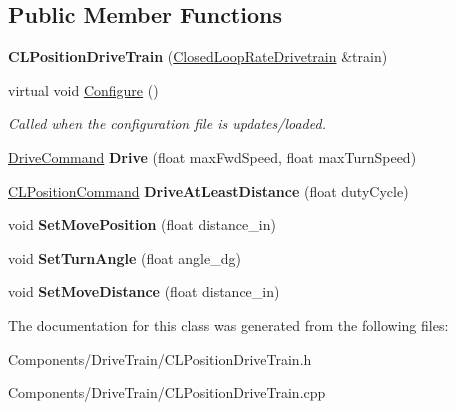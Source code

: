 \subsection*{\-Public \-Member \-Functions}
\begin{DoxyCompactItemize}
\item 
\hypertarget{class_c_l_position_drive_train_aa9de32bb180ef4a456cbe6373b18783f}{
{\bfseries \-C\-L\-Position\-Drive\-Train} (\hyperlink{class_closed_loop_rate_drivetrain}{\-Closed\-Loop\-Rate\-Drivetrain} \&train)}
\label{class_c_l_position_drive_train_aa9de32bb180ef4a456cbe6373b18783f}

\item 
\hypertarget{class_c_l_position_drive_train_ad02b281d4787da186cacb7861fe05f7b}{
virtual void \hyperlink{class_c_l_position_drive_train_ad02b281d4787da186cacb7861fe05f7b}{\-Configure} ()}
\label{class_c_l_position_drive_train_ad02b281d4787da186cacb7861fe05f7b}

\begin{DoxyCompactList}\small\item\em \-Called when the configuration file is updates/loaded. \end{DoxyCompactList}\item 
\hypertarget{class_c_l_position_drive_train_ad20627384860054aa281b9d0013d9715}{
\hyperlink{struct_drive_command}{\-Drive\-Command} {\bfseries \-Drive} (float max\-Fwd\-Speed, float max\-Turn\-Speed)}
\label{class_c_l_position_drive_train_ad20627384860054aa281b9d0013d9715}

\item 
\hypertarget{class_c_l_position_drive_train_aedcfe50dbf3f647af10e18fe56476489}{
\hyperlink{struct_c_l_position_command}{\-C\-L\-Position\-Command} {\bfseries \-Drive\-At\-Least\-Distance} (float duty\-Cycle)}
\label{class_c_l_position_drive_train_aedcfe50dbf3f647af10e18fe56476489}

\item 
\hypertarget{class_c_l_position_drive_train_aecd5e8dd9247edd2c38bde30e92ab23a}{
void {\bfseries \-Set\-Move\-Position} (float distance\-\_\-in)}
\label{class_c_l_position_drive_train_aecd5e8dd9247edd2c38bde30e92ab23a}

\item 
\hypertarget{class_c_l_position_drive_train_af11ab1e144153afb478142d1aae1cd23}{
void {\bfseries \-Set\-Turn\-Angle} (float angle\-\_\-dg)}
\label{class_c_l_position_drive_train_af11ab1e144153afb478142d1aae1cd23}

\item 
\hypertarget{class_c_l_position_drive_train_a10967f59261320410c2c46a6282dfcc7}{
void {\bfseries \-Set\-Move\-Distance} (float distance\-\_\-in)}
\label{class_c_l_position_drive_train_a10967f59261320410c2c46a6282dfcc7}

\end{DoxyCompactItemize}


\-The documentation for this class was generated from the following files\-:\begin{DoxyCompactItemize}
\item 
\-Components/\-Drive\-Train/\-C\-L\-Position\-Drive\-Train.\-h\item 
\-Components/\-Drive\-Train/\-C\-L\-Position\-Drive\-Train.\-cpp\end{DoxyCompactItemize}
